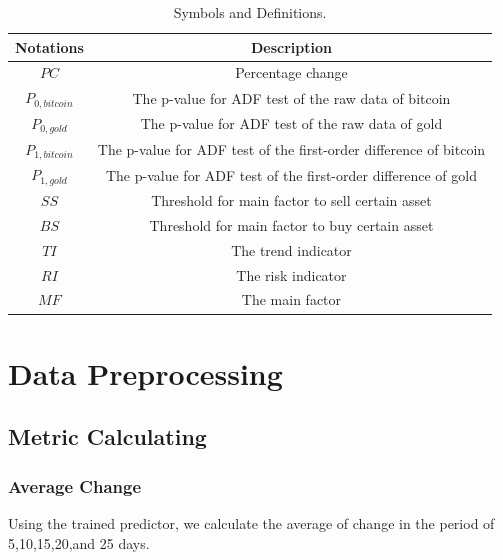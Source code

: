 \documentclass[12pt,a4paper]{article}
\begin{document}
\begin{spacing}{1.2}
\begin{table}[H]
	\renewcommand{\arraystretch}{1.5}
	\caption{Symbols and Definitions.}
	\label{Table_Symbols}
	\begin{center}
		{\footnotesize
			\begin{tabular}{c c}
				\toprule
				{Notations} & {Description} \\
				\midrule
				{$PC$}    & {Percentage change} \\ 
				{$P_{0,bitcoin}$}     & { The p-value for ADF test of the raw data of bitcoin} \\ 
				$P_{0,gold}$   & {The p-value for ADF test of the raw data of gold} \\ 
				$P_{1,bitcoin}$     & { The p-value for ADF test of the first-order difference of bitcoin} \\
				$P_{1,gold}$     & {The p-value for ADF test of the first-order difference of gold} \\ 
				$SS$     & {Threshold for main factor to sell certain asset} \\ 
				$BS$    & {Threshold for main factor to buy certain asset} \\ 
				$TI$     & {The trend indicator} \\ 
				$RI$     & {The risk indicator} \\ 
				$MF$     & {The main factor} \\ 
				\bottomrule
		\end{tabular}}
	\end{center}
\end{table}





\section{Data Preprocessing}
\label{DataPreprocessing}


\subsection{Metric Calculating}

\subsubsection{Average Change}

Using the trained predictor, we calculate the average of change in the period of 5,10,15,20,and 25 days.


\end{spacing}
\end{document}
